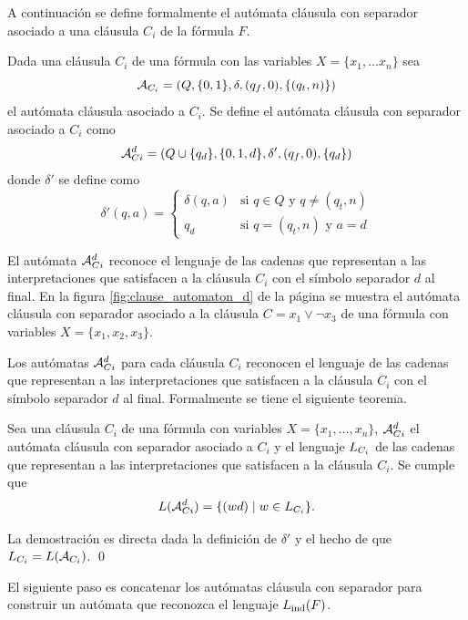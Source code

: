 
A continuación se define formalmente el autómata cláusula con separador asociado a una cláusula $C_i$ de la fórmula $F$.

\begin{definition}
    Dada una cláusula $C_i$ de una fórmula con las variables $X=\{x_1, \ldots x_n\}$ sea
    $$
        \mathcal{A}_{C_i} = (Q, \{0, 1\}, \delta, (q_f, 0), \{(q_t, n)\})
    $$
    el autómata cláusula asociado a $C_i$. Se define el autómata cláusula con separador asociado a $C_i$ como
    $$
        \mathcal{A}_{Ci}^{d} = (Q \cup \{q_d\}, \{0, 1, d\}, \delta', (q_f, 0), \{q_d\})
    $$
    donde $\delta'$ se define como
    $$
        \delta'(q, a) = \begin{cases}
            \delta(q, a) & \text{si } q \in Q \text{ y } q \neq (q_t, n) \\
            q_d          & \text{si } q = (q_t, n) \text{ y } a = d
        \end{cases}
    $$
\end{definition}

El autómata $\mathcal{A}_{Ci}^{d}$ reconoce el lenguaje de las cadenas que representan a las interpretaciones que satisfacen a la cláusula $C_i$ con el símbolo separador $d$ al final. En la figura \ref{fig:clause_automaton_d} de la página \pageref{fig:clause_automaton_d} se muestra el autómata cláusula con separador asociado a la cláusula $C = x_1 \lor \neg x_3$ de una fórmula con variables $X = \{x_1, x_2, x_3\}$.

Los autómatas $\mathcal{A}_{Ci}^{d}$ para cada cláusula $C_i$ reconocen el lenguaje de las cadenas que representan a las interpretaciones que satisfacen a la cláusula $C_i$ con el símbolo separador $d$ al final. Formalmente se tiene el siguiente teorema.

\begin{theorem}
    \label{thm:dautomata}
    Sea una cláusula $C_i$ de una fórmula con variables $X = \{x_1, \ldots, x_n\}$, $\mathcal{A}_{Ci}^{d}$ el autómata cláusula con separador asociado a $C_i$ y el lenguaje $L_{C_i}$ de las cadenas que representan a las interpretaciones que satisfacen a la cláusula $C_i$.
    Se cumple que
    $$
        L(\mathcal{A}_{Ci}^{d}) = \{(wd) \;|\; w \in L_{C_i}\}.
    $$
\end{theorem}

La demostración es directa dada la definición de $\delta'$ y el hecho de que $L_{C_i} = L(\mathcal{A}_{C_i})$. \qed


El siguiente paso es concatenar los autómatas cláusula con separador para construir un autómata que reconozca el lenguaje $L_{\mathrm{ind}}(F)$.

